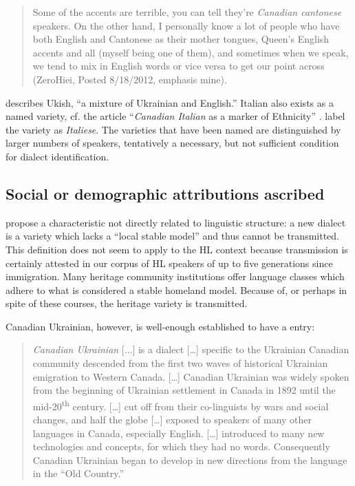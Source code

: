 \documentclass[output=paper]{LSP/langsci}
\begin{document}
\begin{quote}
Some of the accents are terrible, you can tell they’re \textit{Canadian cantonese} speakers. On the other hand, I personally know a lot of people who have both English and Cantonese as their mother tongues, Queen’s English accents and all (myself being one of them), and sometimes when we speak, we tend to mix in English words or vice versa to get our point across (ZeroHiei, Posted 8/18/2012, emphasis mine).
\end{quote}

\citet[71]{struk_between_2000} describes Ukish, “a mixture of Ukrainian and English.” Italian also exists as a named variety, cf. the article “\textit{Canadian Italian} as a marker of Ethnicity” \citep{danesi_canadian_1983,danesi_canadian_1984}. \citet{giovanardi_inglese_2003} label the variety as \textit{Italiese}. The varieties that have been named are distinguished by larger numbers of speakers, tentatively a necessary, but not sufficient condition for dialect identification.

\subsection{Social or demographic attributions ascribed}

\citet{auer_birth_2004} propose a characteristic not directly related to linguistic structure: a new dialect is a variety which lacks a “local stable model” and thus cannot be transmitted. This definition does not seem to apply to the HL context because transmission is certainly attested in our corpus of HL speakers of up to five generations since immigration. Many heritage community institutions offer language classes which adhere to what is considered a stable homeland model. Because of, or perhaps in spite of these courses, the heritage variety is transmitted. 

Canadian Ukrainian, however, is well-enough established to have a \citet{wikipedia_canadian_2014} entry:

\begin{quote}
\textit{Canadian Ukrainian}\textit{ }[...] is a dialect […] specific to the Ukrainian Canadian community descended from the first two waves of historical Ukrainian emigration to Western Canada. […] Canadian Ukrainian was widely spoken from the beginning of Ukrainian settlement in Canada in 1892 until the mid-20\textsuperscript{th} century. […] cut off from their co-linguists by wars and social changes, and half the globe […] exposed to speakers of many other languages in Canada, especially English. […] introduced to many new technologies and concepts, for which they had no words. Consequently Canadian Ukrainian began to develop in new directions from the language in the “Old Country.”  
\end{quote}
\end{document}
